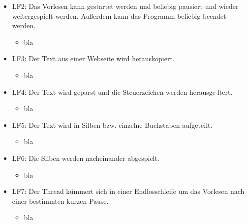 \documentclass[12pt]{scrartcl}
\begin{document}
\begin{itemize}
	\item LF2: Das Vorlesen kann gestartet werden und beliebig pausiert und wieder weitergespielt
werden. Außerdem kann das Programm beliebig beendet werden.
\begin{itemize}
	\item bla
\end{itemize}
\end{itemize}

\begin{itemize}
	\item LF3: Der Text aus einer Webseite wird herauskopiert.
\begin{itemize}
	\item bla
\end{itemize}
\end{itemize}

\begin{itemize}
	\item LF4: Der Text wird geparst und die Steuerzeichen werden herausgeltert.
\begin{itemize}
	\item bla
\end{itemize}
\end{itemize}

\begin{itemize}
	\item LF5: Der Text wird in Silben bzw. einzelne Buchstaben aufgeteilt.
\begin{itemize}
	\item bla
\end{itemize}
\end{itemize}

\begin{itemize}
	\item LF6: Die Silben werden nacheinander abgespielt.
\begin{itemize}
	\item bla
\end{itemize}
\end{itemize}

\begin{itemize}
	\item LF7: Der Thread kümmert sich in einer Endlosschleife um das Vorlesen nach einer
bestimmten kurzen Pause.
\begin{itemize}
	\item bla
\end{itemize}
\end{itemize}
\end{document}
